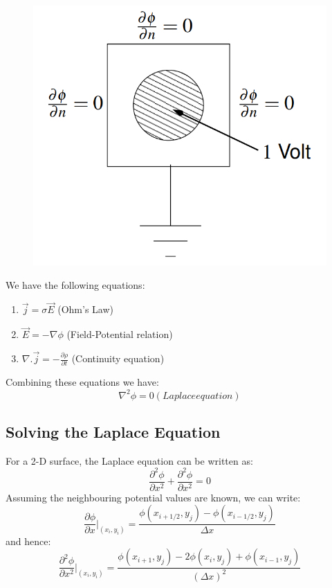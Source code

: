 \documentclass[12pt, a4paper]{article}
\begin{document}
\begin{figure}[H]
    \centering
    \includegraphics[scale = 0.6]{Figure_0.png}
\end{figure}
We have the following equations:
\vspace{-0.5cm}
\begin{enumerate}
    \item $\vec{j} = \sigma \vec{E}$ (Ohm's Law)
    \item $\vec{E} = -\nabla \phi$ (Field-Potential relation)
    \item $\nabla .\vec{j} = -\frac{\partial \rho}{\partial t}$ (Continuity equation)
\end{enumerate}
Combining these equations we have:
\begin{equation*}
    \nabla ^{2}\phi = 0  (Laplace equation)
\end{equation*}
\subsection{Solving the Laplace Equation}
For a 2-D surface, the Laplace equation can be written as:
\begin{equation*}
    \frac{\partial ^{2}\phi}{\partial x^{2}} + \frac{\partial ^{2}\phi}{\partial x^{2}} = 0
\end{equation*}
Assuming the neighbouring potential values are known, we can write:
\begin{equation*}
    \frac{\partial \phi}{\partial x} \bigg\rvert _ {(x_{i},y_{i})} = \frac{\phi (x_{i+1/2},y_{j}) - \phi (x_{i-1/2},y_{j})}{\Delta x}
\end{equation*}
and hence:
\vspace{0.2cm}
\begin{equation*}
    \frac{\partial ^{2}\phi}{\partial x^{2}} \bigg\rvert _ {(x_{i},y_{i})} = \frac{\phi (x_{i+1},y_{j}) - 2\phi (x_{i},y_{j}) + \phi (x_{i-1},y_{j})}{(\Delta x)^{2}}
\end{equation*}
\end{document}
